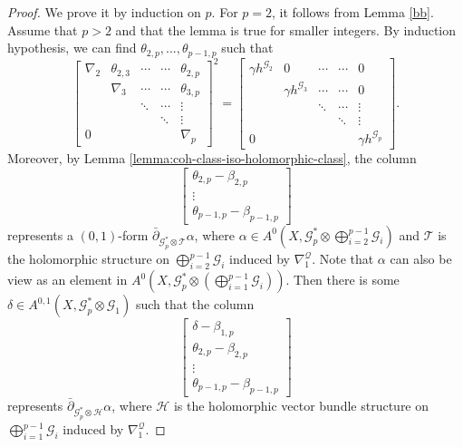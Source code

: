 \documentclass[english,reqno]{amsart}
\newcommand\sG{{\mathscr G}}
\newcommand\sQ{{\mathscr Q}}
\newcommand\sT{{\mathscr T}}
\newcommand\sH{{\mathscr H}}
\newcommand\bp{{\bar\partial}}
\theoremstyle{plain}
\theoremstyle{definition}
\numberwithin{equation}{section} %
\begin{document}
\begin{proof}
    We  prove it by induction on $p$. For $p=2$, it follows from Lemma \ref{bb}.  Assume that $p>2$ and that the lemma is true for smaller integers. By induction hypothesis, we can find $\theta_{2,p},...,\theta_{p-1,p}$ such that
    \[
    \begin{bmatrix}
    \nabla_2 & \theta_{2,3} & \cdots & \cdots & \theta_{2,p} \\
    &\nabla_3  & \cdots & \cdots& \theta_{3,p}  \\
    & & \ddots & \cdots & \vdots  \\
    & & & \ddots & \vdots  \\
    0 & & & & \nabla_{p}
    \end{bmatrix}^2
    =
    \begin{bmatrix}
    \gamma h^{\sG_2} &  0 & \cdots & \cdots & 0 \\
    & \gamma h^{\sG_3} & \cdots & \cdots& 0  \\
    & &\ddots & \cdots & \vdots  \\
    & & & \ddots & \vdots  \\
    0 & & & &  \gamma h^{\sG_{p}}
    \end{bmatrix}.
    \]
    Moreover, by Lemma \ref{lemma:coh-class-iso-holomorphic-class}, the column
    \[
    \begin{bmatrix}
    \theta_{2,p}-\beta_{2,p}\\
    \vdots\\
    \theta_{p-1,p}-\beta_{p-1,p}
    \end{bmatrix}
    \]
    represents a $(0,1)$-form $\bp_{\sG_p^*\otimes \sT} \alpha$, where $\alpha \in A^0(X,\sG_p^*\otimes \bigoplus_{i=2}^{p-1} \sG_i)$ and $\sT$ is the holomorphic  structure on $\bigoplus_{i=2}^{p-1} \sG_i$ induced by $\nabla^\sQ_1$.
    Note that $\alpha$ can also be view as an element in $A^0(X, \sG_p^*\otimes ( \bigoplus_{i=1}^{p-1} \sG_i))$.
    Then there is some $\delta \in A^{0,1}(X,\sG_p^*\otimes \sG_1)$ such that the column
    \[
    \begin{bmatrix}
    \delta - \beta_{1,p}\\
    \theta_{2,p}-\beta_{2,p}\\
    \vdots\\
    \theta_{p-1,p}-\beta_{p-1,p}
    \end{bmatrix}
    \]
    represents $\bp_{\sG_p^*\otimes \sH} \alpha$, where $\sH$ is the holomorphic vector bundle structure on $\bigoplus_{i=1}^{p-1} \sG_i$ induced by $\nabla^\sQ_1$.


\end{proof}
\end{document}
